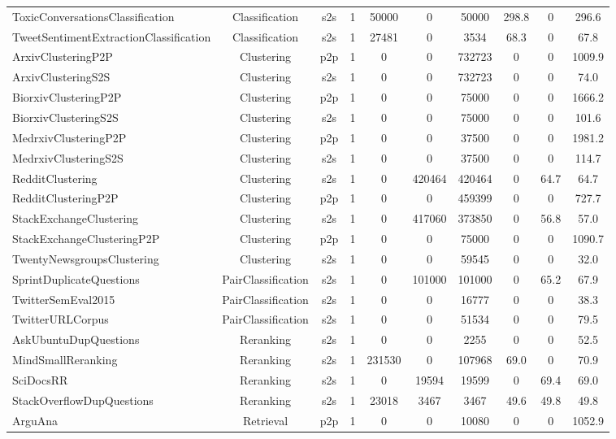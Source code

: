 \documentclass[11pt]{article}
\begin{document}
\begin{table*}[!t]
{\begin{tabular}{l|ccccccccc}
ToxicConversationsClassification & Classification & s2s & 1 & 50000 & 0 & 50000 & 298.8 & 0 & 296.6  \\
TweetSentimentExtractionClassification & Classification & s2s & 1 & 27481 & 0 & 3534 & 68.3 & 0 & 67.8  \\
\midrule
ArxivClusteringP2P & Clustering & p2p & 1 & 0 & 0 & 732723 & 0 & 0 & 1009.9  \\
ArxivClusteringS2S & Clustering & s2s & 1 & 0 & 0 & 732723 & 0 & 0 & 74.0  \\
BiorxivClusteringP2P & Clustering & p2p & 1 & 0 & 0 & 75000 & 0 & 0 & 1666.2  \\
BiorxivClusteringS2S & Clustering & s2s & 1 & 0 & 0 & 75000 & 0 & 0 & 101.6  \\
MedrxivClusteringP2P & Clustering & p2p & 1 & 0 & 0 & 37500 & 0 & 0 & 1981.2  \\
MedrxivClusteringS2S & Clustering & s2s & 1 & 0 & 0 & 37500 & 0 & 0 & 114.7  \\
RedditClustering & Clustering & s2s & 1 & 0 & 420464 & 420464 & 0 & 64.7 & 64.7  \\
RedditClusteringP2P & Clustering & p2p & 1 & 0 & 0 & 459399 & 0 & 0 & 727.7  \\
StackExchangeClustering & Clustering & s2s & 1 & 0 & 417060 & 373850 & 0 & 56.8 & 57.0  \\
StackExchangeClusteringP2P & Clustering & p2p & 1 & 0 & 0 & 75000 & 0 & 0 & 1090.7  \\
TwentyNewsgroupsClustering & Clustering & s2s & 1 & 0 & 0 & 59545 & 0 & 0 & 32.0  \\
\midrule
SprintDuplicateQuestions & PairClassification & s2s & 1 & 0 & 101000 & 101000 & 0 & 65.2 & 67.9  \\
TwitterSemEval2015 & PairClassification & s2s & 1 & 0 & 0 & 16777 & 0 & 0 & 38.3  \\
TwitterURLCorpus & PairClassification & s2s & 1 & 0 & 0 & 51534 & 0 & 0 & 79.5  \\
\midrule
AskUbuntuDupQuestions & Reranking & s2s & 1 & 0 & 0 & 2255 & 0 & 0 & 52.5  \\
MindSmallReranking & Reranking & s2s & 1 & 231530 & 0 & 107968 & 69.0 & 0 & 70.9  \\
SciDocsRR & Reranking & s2s & 1 & 0 & 19594 & 19599 & 0 & 69.4 & 69.0  \\
StackOverflowDupQuestions & Reranking & s2s & 1 & 23018 & 3467 & 3467 & 49.6 & 49.8 & 49.8  \\
\midrule
ArguAna & Retrieval & p2p & 1 & 0 & 0 & 10080 & 0 & 0 & 1052.9  \\

\end{tabular}}
\end{table*}
\end{document}
